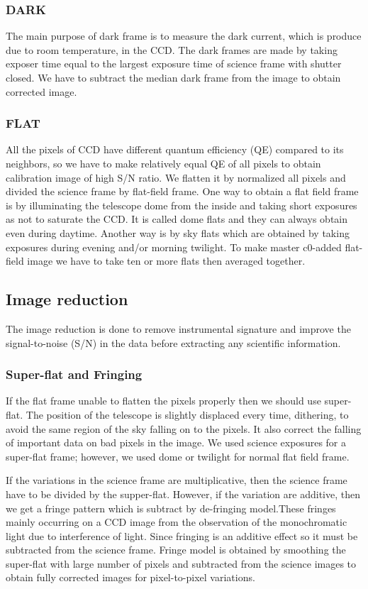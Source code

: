 \subsubsection{DARK}
The main purpose of dark frame is to measure the dark current, which is produce due to room temperature, in the CCD. The dark frames are made by taking exposer time equal to the largest exposure time of science frame with shutter closed. We have to subtract the median dark frame from the image to obtain corrected image.    
\subsubsection{FLAT}
All the pixels of CCD have different quantum efficiency (QE) compared to its neighbors, so we have to make relatively equal QE of all pixels to obtain calibration image of high S/N ratio. We flatten it by normalized all pixels and divided the science frame by flat-field frame. One way to obtain a flat field frame is by illuminating the telescope dome from the inside and taking short exposures as not to saturate the CCD. It is called dome flats and they can always obtain even during daytime. Another way is by sky flats which are obtained by taking exposures during evening and/or morning twilight. To make master c0-added flat-field image we have to take ten or more flats then averaged together.
\subsection{Image reduction}
The image reduction is done to remove instrumental signature and improve the signal-to-noise (S/N) in the data before extracting any scientific information\cite{manual}.
\subsubsection{Super-flat and Fringing}
If the flat frame unable to flatten the pixels properly then we should use super-flat. The position of the telescope is slightly displaced every time, dithering, to avoid the same region of the sky falling on to the pixels. It also correct the falling of important data on bad pixels in the image. We used science exposures for a super-flat frame; however, we used dome or twilight for normal flat field frame.

 If the variations in the science frame are multiplicative, then the science frame  have to be divided by the supper-flat. However, if the variation are additive, then  we get a fringe pattern which is subtract by de-fringing model.These fringes mainly occurring on a CCD image from the observation of the monochromatic light due to interference of light. Since fringing is an additive effect so it must be subtracted from the science frame. Fringe model is obtained by smoothing the super-flat with large number of pixels and subtracted from the science images to obtain fully corrected images for pixel-to-pixel variations.

